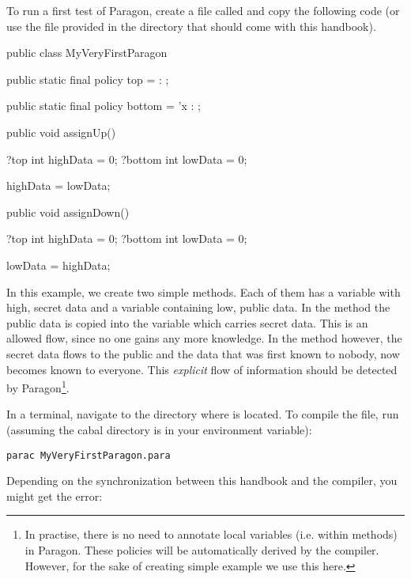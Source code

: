 To run a first test of Paragon, create a file called 
 and copy the following code (or use the file
provided in the  directory that should come with this handbook).

\begin{paragoncode}
public class MyVeryFirstParagon {

  public static final policy top = { : } ;
  
  public static final policy bottom = { 'x : } ;
  
  public void assignUp() {
  
    ?top int highData = 0;
    ?bottom int lowData = 0;
    
    highData = lowData;
    
  }
  
  public void assignDown() {
  
    ?top int highData = 0;
    ?bottom int lowData = 0;
    
    lowData = highData;
    
  }

}
\end{paragoncode}

In this example, we create two simple methods. Each of them has a variable with
high, secret data and a variable containing low, public data. In the method
 the public data is copied into the variable which carries secret
data. This is an allowed flow, since no one gains any more knowledge. In the
method  however, the secret data flows to the public and the
data that was first known to nobody, now becomes known to everyone. This 
\emph{explicit} flow of information should be detected by Paragon\footnote{
In practise, there is no need to annotate local variables (i.e. within methods)
in Paragon. These policies will be automatically derived by the compiler. However,
for the sake of creating simple example we use this here.
}.

In a terminal, navigate to the directory where 
is located. To compile the file, run (assuming the cabal  directory
is in your  environment variable):

\begin{lstlisting}
parac MyVeryFirstParagon.para
\end{lstlisting}

Depending on the synchronization between this handbook and the compiler, you 
might get the error:

